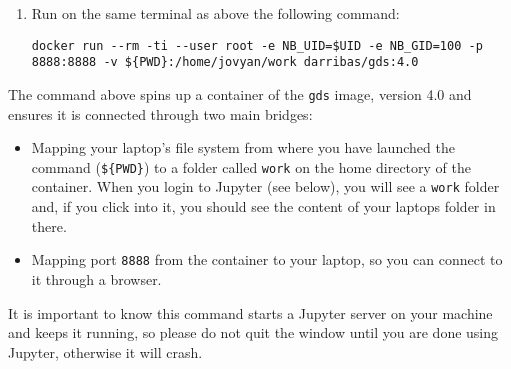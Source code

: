 \documentclass[
]{book}
\providecommand{\tightlist}{%
  \setlength{\itemsep}{0pt}\setlength{\parskip}{0pt}}
\begin{document}
\begin{enumerate}
\def\labelenumi{\arabic{enumi}.}
\item
  Run on the same terminal as above the following command:

\begin{verbatim}
docker run --rm -ti --user root -e NB_UID=$UID -e NB_GID=100 -p 8888:8888 -v ${PWD}:/home/jovyan/work darribas/gds:4.0
\end{verbatim}
\end{enumerate}

The command above spins up a container of the \texttt{gds} image, version 4.0 and
ensures it is connected through two main bridges:

\begin{itemize}
\tightlist
\item
  Mapping your laptop's file system from where you have launched the
  command (\texttt{\$\{PWD\}}) to a folder called \texttt{work} on the home directory of
  the container. When you login to Jupyter (see below), you will see a
  \texttt{work} folder and, if you click into it, you should see the content of
  your laptops folder in there.
\item
  Mapping port \texttt{8888} from the container to your laptop, so you can
  connect to it through a browser.
\end{itemize}

It is important to know this command starts a Jupyter server on your machine and keeps it running, so please do not quit the window until you are
done using Jupyter, otherwise it will crash.
\end{document}

